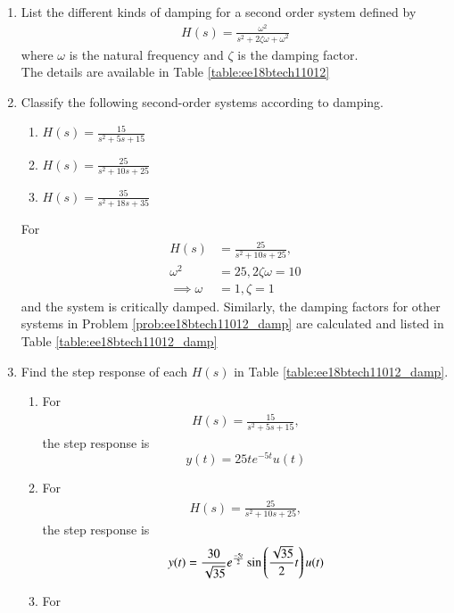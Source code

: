 \begin{enumerate}[label=\thesubsection.\arabic*.,ref=\thesubsection.\theenumi]
\item List the different kinds of damping for a second order system defined by 
\begin{align}
\label{eq:ee18btech11012_second}
H(s)=\frac{\omega^2}{s^2+2\zeta\omega+\omega^2}
\end{align}
where $\omega$ is  the natural   frequency  and $ \zeta $  is the  damping factor.
%
\\
\solution The details are available in Table \ref{table:ee18btech11012}
\begin{table}[!ht]
\centering

\caption{}
\label{table:ee18btech11012}
\end{table}

\item Classify the following second-order systems according to damping.
\label{prob:ee18btech11012_damp}
\begin{enumerate}
\item $H(s) = \frac{15}{{s^2+5s+15}}$ 
\item $H(s) = \frac{25}{{s^2+10s+25}}$
\item $H(s) =\frac{35}{{s^2+18s+35}}$ 
\end{enumerate}
\solution For 
\begin{align}
H(s) &= \frac{25}{{s^2+10s+25}},
\\
     \omega^2 &= 25,   2\zeta\omega =10\\
\implies  \omega &=1,  {\zeta} = 1
\end{align}
and the system is critically damped.  Similarly, the damping factors for other systems in Problem \ref{prob:ee18btech11012_damp} are calculated and listed in Table \ref{table:ee18btech11012_damp}
%
\begin{table}[!ht]
\centering

\caption{}
\label{table:ee18btech11012_damp}
\end{table}

\item Find the step response of each $H(s)$ in Table \ref{table:ee18btech11012_damp}.
\\
\solution 
\begin{enumerate}
\item For 
\begin{align}
 H(s)=\frac{15}{s^2+5s+15},
\end{align}
%
the step response is
\begin{equation}
y(t)=25te^{-5t}u(t)
\label{eq:ee18btech11012_over}
\end{equation}
\item For 
%
\begin{align}
H(s)=\frac{25}{s^2+10s+25},
\end{align}
%
the step response is
\begin{equation}
y(t)=\frac{30}{\sqrt{35}}e^{\frac{-5t}{2}}\sin\left(\frac{\sqrt{35}}{2}t\right)u(t)
\label{eq:ee18btech11012_critical}
\end{equation}
\item  For 


\end{enumerate}
\end{enumerate}
